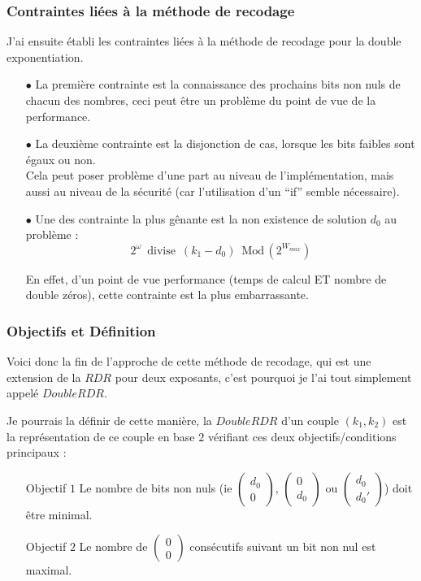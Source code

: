 \documentclass[12pt, a4paper]{memoir}
\newcommand{\doublezero}{\begin{pmatrix} 0 \\ 0 \end{pmatrix}}
\begin{document}
\subsubsection{Contraintes liées à la méthode de recodage}

J'ai ensuite établi les contraintes liées à la méthode de recodage pour la double exponentiation.
\begin{itemize}
 \item [$\bullet$] La première contrainte est la connaissance des prochains bits non nuls de chacun des nombres, ceci peut être un problème du point de vue de la performance.
 \item [$\bullet$] La deuxième contrainte est la disjonction de cas, lorsque les bits faibles sont égaux ou non. \\
 Cela peut poser problème d'une part au niveau de l'implémentation, mais aussi au niveau de la sécurité (car l'utilisation d'un ``if'' semble nécessaire).
 \item [$\bullet$] Une des contrainte la plus gênante est la non existence de solution $d_0$ au problème :
\begin{equation}
 2^{\omega} \,\,\, \text{divise} \,\,\, (k_1 - d_0) \,\,\, \text{Mod} \, (2^{W_{max}})
\end{equation}

 
 En effet, d'un point de vue performance (temps de calcul ET nombre de double zéros), cette contrainte est la plus embarrassante.
\end{itemize}

\subsubsection{Objectifs et Définition}

Voici donc la fin de l'approche de cette méthode de recodage, qui est une extension de la $RDR$ pour deux exposants,
c'est pourquoi je l'ai tout simplement appelé $DoubleRDR$.

Je pourrais la définir de cette manière, la $DoubleRDR$ d'un couple $(k_1 , k_2)$ est la représentation
de ce couple en base $2$ vérifiant ces deux objectifs/conditions principaux :

\begin{itemize}
 \item [Objectif $1$] Le nombre de bits non nuls 
 (ie $\begin{pmatrix} d_0 \\ 0 \end{pmatrix}$,
 $\begin{pmatrix} 0 \\ d_0 \end{pmatrix}$ ou
 $\begin{pmatrix} d_0 \\ d_0' \end{pmatrix}$)
 doit être minimal.
 \item [Objectif $2$] Le nombre de $\doublezero$ consécutifs suivant un bit non nul est maximal. 
\end{itemize}
\end{document}
